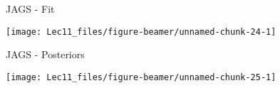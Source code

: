 \documentclass[11pt,ignorenonframetext,]{beamer}
\begin{document}
\begin{frame}{JAGS - Fit}
\protect\hypertarget{jags---fit}{}

\begin{center}\texttt{[image: Lec11\_files/figure-beamer/unnamed-chunk-24-1]} \end{center}

\end{frame}

\begin{frame}{JAGS - Posteriors}
\protect\hypertarget{jags---posteriors}{}

\begin{center}\texttt{[image: Lec11\_files/figure-beamer/unnamed-chunk-25-1]} \end{center}

\end{frame}
\end{document}
